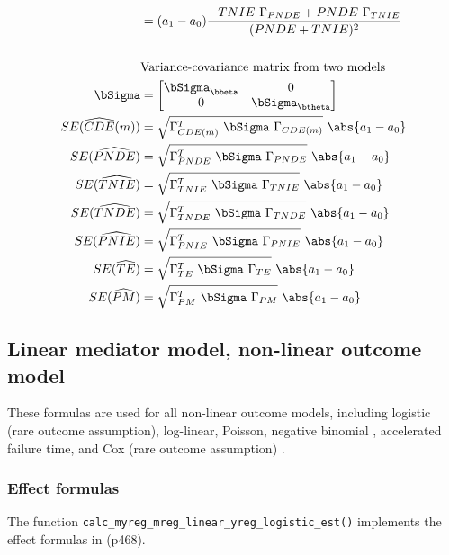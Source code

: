 \documentclass[10pt]{article}
\begin{document}
\begin{align*}
  &= (a_{1}-a_{0}) \frac{-TNIE~\Gamma_{PNDE} + PNDE~\Gamma_{TNIE}}{(PNDE+TNIE)^{2}}\\
  \\
  &\text{Variance-covariance matrix from two models}\\
  \bSigma &=
           \begin{bmatrix}
             \bSigma_{\bbeta} & 0 \\
             0 & \bSigma_{\btheta} \\
           \end{bmatrix}\\
  SE(\widehat{CDE}(m)) &= \sqrt{\Gamma_{CDE(m)}^{T} ~\bSigma~ \Gamma_{CDE(m)}} ~ \abs{a_{1} - a_{0}}\\
  SE(\widehat{PNDE}) &= \sqrt{\Gamma_{PNDE}^{T} ~\bSigma~ \Gamma_{PNDE}} ~ \abs{a_{1} - a_{0}}\\
  SE(\widehat{TNIE}) &= \sqrt{\Gamma_{TNIE}^{T} ~\bSigma~ \Gamma_{TNIE}} ~ \abs{a_{1} - a_{0}}\\
  SE(\widehat{TNDE}) &= \sqrt{\Gamma_{TNDE}^{T} ~\bSigma~ \Gamma_{TNDE}} ~ \abs{a_{1} - a_{0}}\\
  SE(\widehat{PNIE}) &= \sqrt{\Gamma_{PNIE}^{T} ~\bSigma~ \Gamma_{PNIE}} ~ \abs{a_{1} - a_{0}}\\
  SE(\widehat{TE}) &= \sqrt{\Gamma_{TE}^{T} ~\bSigma~ \Gamma_{TE}} ~ \abs{a_{1} - a_{0}}\\
  SE(\widehat{PM}) &= \sqrt{\Gamma_{PM}^{T} ~\bSigma~ \Gamma_{PM}} ~ \abs{a_{1} - a_{0}}\\
\end{align*}


\subsection{Linear mediator model, non-linear outcome model}
\label{sec:orgcc5cf2d}
These formulas are used for all non-linear outcome models, including logistic (rare outcome assumption), log-linear, Poisson, negative binomial \cite{valeriMediationAnalysisAllowing2013}, accelerated failure time, and Cox (rare outcome assumption) \cite{valeriSASMacroCausal2015}.

\subsubsection{Effect formulas}
\label{sec:org16f55a2}
The function \texttt{calc\_myreg\_mreg\_linear\_yreg\_logistic\_est()} implements the effect formulas in \cite{vanderweeleExplanationCausalInference2015} (p468).
\end{document}
